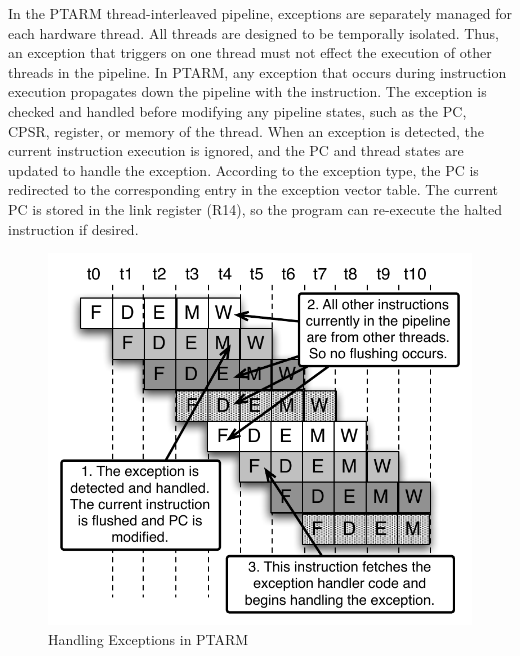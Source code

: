 In the PTARM thread-interleaved pipeline, exceptions are separately managed for each hardware thread.  
All threads are designed to be temporally isolated.
Thus, an exception that triggers on one thread must not effect the execution of other threads in the pipeline.
In PTARM, any exception that occurs during instruction execution propagates down the pipeline with the instruction.
The exception is checked and handled before modifying any pipeline states, such as the PC, CPSR, register, or memory of the thread.  
When an exception is detected, the current instruction execution is ignored, and the PC and thread states are updated to handle the exception.   
According to the exception type, the PC is redirected to the corresponding entry in the exception vector table. 
The current PC is stored in the link register (R14), so the program can re-execute the halted instruction if desired.

\begin{figure}
  \vspace{-30pt}
  \begin{center}
    \includegraphics[scale=.65]{figs/exception_handling_pipeline}
  \end{center}
  \vspace{-3mm}
  \caption{Handling Exceptions in PTARM}
  \label{fig:exception_handling_pipeline}
  \vspace{-10pt}
\end{figure}

